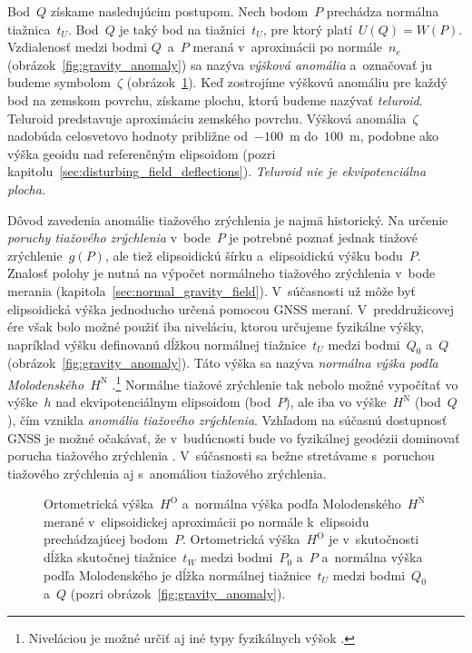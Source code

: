 \documentclass[a4paper, 12pt]{book}
\begin{document}
Bod~$Q$ získame nasledujúcim postupom.  Nech bodom~$P$ prechádza normálna 
tiažnica~$t_U$.  Bod~$Q$ je taký bod na tiažnici~$t_U$, pre ktorý platí~$U(Q) 
= W(P)$.  Vzdialenosť medzi bodmi $Q$~a~$P$ meraná v~aproximácii po 
normále~$n_e$ (obrázok~\ref{fig:gravity_anomaly}) sa nazýva \emph{výšková 
anomália} a~označovať ju budeme symbolom~$\zeta$ (obrázok~\ref{fig:heights}).  
Keď zostrojíme výškovú anomáliu pre každý bod na zemskom povrchu, získame 
plochu, ktorú budeme nazývať \emph{teluroid}.  Teluroid predstavuje aproximáciu 
zemského povrchu.  Výšková anomália~$\zeta$ nadobúda celosvetovo hodnoty 
približne od~$-100$~m do~$100$~m, podobne ako výška geoidu nad referenčným 
elipsoidom (pozri kapitolu~\ref{sec:disturbing_field_deflections}).  
\emph{Teluroid nie je ekvipotenciálna plocha}.

Dôvod zavedenia anomálie tiažového zrýchlenia je najmä historický.  Na určenie 
\emph{poruchy tiažového zrýchlenia} v~bode~$P$ je potrebné poznať jednak 
tiažové zrýchlenie~$g(P)$, ale tiež elipsoidickú šírku a~elipsoidickú výšku 
bodu~$P$.  Znalosť polohy je nutná na výpočet normálneho tiažového zrýchlenia 
v~bode merania (kapitola~\ref{sec:normal_gravity_field}).  V~súčasnosti už môže 
byť elipsoidická výška jednoducho určená pomocou GNSS meraní.  V~preddružicovej 
ére však bolo možné použiť iba niveláciu, ktorou určujeme fyzikálne výšky, 
napríklad výšku definovanú dĺžkou normálnej tiažnice~$t_U$ medzi bodmi~$Q_0$ 
a~$Q$ (obrázok~\ref{fig:gravity_anomaly}).  Táto výška sa nazýva \emph{normálna 
výška podľa Molodenského}~$H^\mathrm{N}$ 
\parencite{MoritzPhysicalGeodesy}.\footnote{Niveláciou je možné určiť aj iné 
typy fyzikálnych výšok \parencite[pozri][]{MoritzPhysicalGeodesy}.}  Normálne 
tiažové zrýchlenie tak nebolo možné vypočítať vo výške~$h$ nad ekvipotenciálnym 
elipsoidom (bod~$P$), ale iba vo výške~$H^\mathrm{N}$ (bod~$Q$), čím vznikla 
\emph{anomália tiažového zrýchlenia}.  Vzhľadom na súčasnú dostupnosť GNSS je 
možné očakávať, že v~budúcnosti bude vo fyzikálnej geodézii dominovať porucha 
tiažového zrýchlenia \parencite{MoritzPhysicalGeodesy}.  V~súčasnosti sa bežne 
stretávame s~poruchou tiažového zrýchlenia aj s~anomáliou tiažového zrýchlenia.

\begin{figure}[bt]
\centering

\caption{Ortometrická výška~$H^\mathrm{O}$ a~normálna výška podľa 
Molodenského~$H^\mathrm{N}$ merané v~elipsoidickej aproximácii po normále 
k~elipsoidu prechádzajúcej bodom~$P$.  Ortometrická výška~$H^\mathrm{O}$ je 
v~skutočnosti dĺžka skutočnej tiažnice~$t_W$ medzi bodmi~$P_0$ a~$P$ a~normálna 
výška podľa Molodenského je dĺžka normálnej tiažnice~$t_U$ medzi bodmi~$Q_0$ 
a~$Q$ (pozri obrázok~\ref{fig:gravity_anomaly}).}
\label{fig:heights}
\end{figure}
\end{document}

